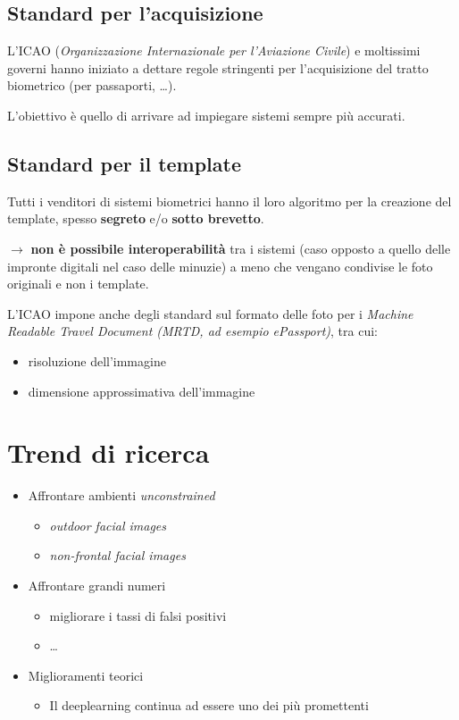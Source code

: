 \documentclass{report}
\begin{document}
\subsection{Standard per l'acquisizione}
L'ICAO (\textit{Organizzazione Internazionale per l'Aviazione Civile}) e moltissimi 
governi hanno iniziato a dettare regole stringenti per l'acquisizione del tratto 
biometrico (per passaporti, \dots).

\noindent L'obiettivo è quello di arrivare ad impiegare sistemi sempre più accurati.

\subsection{Standard per il template}
Tutti i venditori di sistemi biometrici hanno il loro algoritmo per la creazione
del template, spesso \textbf{segreto} e/o \textbf{sotto brevetto}.

$\rightarrow$ \textbf{non è possibile interoperabilità} tra i sistemi (caso opposto 
a quello delle impronte digitali nel caso delle minuzie) a meno che vengano
condivise le foto originali e non i template.

\noindent L'ICAO impone anche degli standard sul formato delle foto per i 
\textit{Machine Readable Travel Document (MRTD, ad esempio ePassport)}, tra cui:
\begin{itemize}
    \item risoluzione dell'immagine 
    \item dimensione approssimativa dell'immagine
\end{itemize}

\section{Trend di ricerca}
\begin{itemize}
    \item Affrontare ambienti \textit{unconstrained}
    \begin{itemize}
        \item \textit{outdoor facial images}
        \item \textit{non-frontal facial images}
    \end{itemize}
    \item Affrontare grandi numeri 
    \begin{itemize}
        \item migliorare i tassi di falsi positivi 
        \item \dots
    \end{itemize}
    \item Miglioramenti teorici 
    \begin{itemize}
        \item Il deeplearning continua ad essere uno dei più promettenti
    \end{itemize}
\end{itemize}
\end{document}
